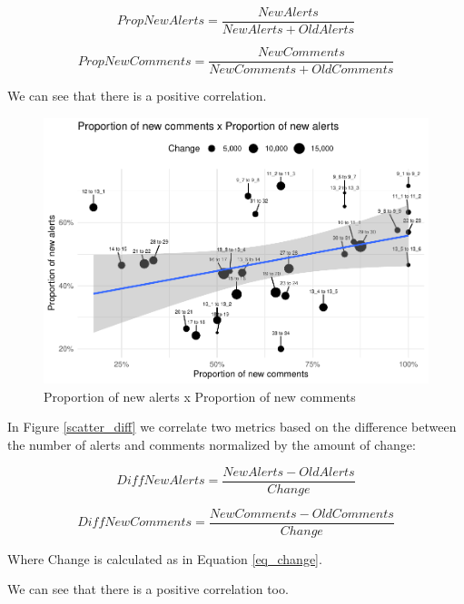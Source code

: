 \documentclass[
]{article}
\begin{document}
\[PropNewAlerts = \frac{NewAlerts}{NewAlerts + OldAlerts}\]

\[PropNewComments = \frac{NewComments}{NewComments + OldComments}\]

We can see that there is a positive correlation.

%
%

\small

\begin{figure}
\centering
\includegraphics{report_files/figure-latex/unnamed-chunk-20-1.pdf}
\caption{\label{scatter_prop}Proportion of new alerts x Proportion of
new comments}
\end{figure}

\normalsize

In Figure \ref{scatter_diff} we correlate two metrics based on the
difference between the number of alerts and comments normalized by the
amount of change:

\[DiffNewAlerts = \frac{NewAlerts - OldAlerts}{Change}\]

\[DiffNewComments = \frac{NewComments - OldComments}{Change}\]

Where Change is calculated as in Equation \ref{eq_change}.

We can see that there is a positive correlation too.

\small
\end{document}
